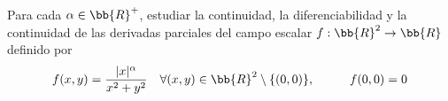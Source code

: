 \begin{ejercicio}
    Para cada $ \alpha \in \bb{R}^+$, estudiar la continuidad, la diferenciabilidad y la continuidad de las derivadas parciales del campo escalar $f: \bb{R}^2 \to \bb{R}$ definido por 
    \begin{equation*}
        f(x,y) = \frac{|x|^{\alpha}}{x^2 + y^2} \quad \forall (x,y) \in \bb{R}^2\setminus\{(0,0)\}, \hspace{1cm}   f(0,0) = 0
    \end{equation*}

    \begin{comment}

    Sea $C=\{(x,y)\in \bb{R}^2\mid x=0\}$. Tenemos que es un cerrado, por lo que $U=\bb{R}^2\setminus C$ es un abierto. Tenemos que $f_{\big| U}$ es cociente de dos funciones. El denominador es polinómica, por lo que es de clase $1$. El numerador es una composición del valor absoluto (que es de clase $1$ en $U$), con la potencia de orden positivo, que es de clase $1$ en $\bb{R}^+$. Por tanto, $f_{\big| U}$ es de clase $1$. Por el carácter local de la derivabilidad y la continuidad, tenemos que $f$ es continua y diferenciable en todo punto de $U$. Además, sus derivadas parciales son continuas en todo punto de $U$, siendo estas en todo $(x,y)\in U$:
    \begin{gather*}
        \del{f}{x}(x,y) = \frac{\alpha|x|^{\alpha-1}\cdot \frac{x}{|x|}\cdot (x^2+y^2) - |x|^\alpha(2x)}{(x^2+y^2)^2}
        = \frac{\alpha x\cdot |x|^{\alpha-2}\cdot (x^2+y^2) - |x|^\alpha(2x)}{(x^2+y^2)^2} \\
        \del{f}{y}(x,y) = \frac{-2y|x|^\alpha}{(x^2+y^2)^2}
    \end{gather*}

    Buscamos ahora saber el valor de las derivadas parciales en todo punto de $C$. Sabemos que $C=\{(0,c) \mid c\in \bb{R}\}$. Por facilidad, calculamos en primer lugar la derivada parcial respecto de $y$.
    \begin{equation*}
        \del{f}{y}(0,c) = \lim_{y\to c} \frac{f(0,y) - f(0,c)}{y-c}
        = \lim_{y\to c} \frac{0-0}{y-c} = 0
    \end{equation*}
    donde he empleado que $f(0,y)=0 \qquad \forall y\in \bb{R}$.

    A partir de ahora, estudiamos el origen por separado:
    \begin{enumerate}
        \item \ul{Para $c\neq 0$}:

        Veamos ahora el valor de la derivada parcial respecto de $x$:
        \begin{equation*}
            \del{f}{x}(0,c) = \lim_{x\to 0} \frac{f(x,c) - f(0,c)}{x-0}
            = \lim_{x\to 0} \frac{|x|^\alpha}{x(x^2+c^2)}
            = \lim_{x\to 0} \frac{|x|}{x}\cdot \frac{|x|^{\alpha-1}}{x^2+c^2}
        \end{equation*}
    

\end{comment}
\end{ejercicio}
